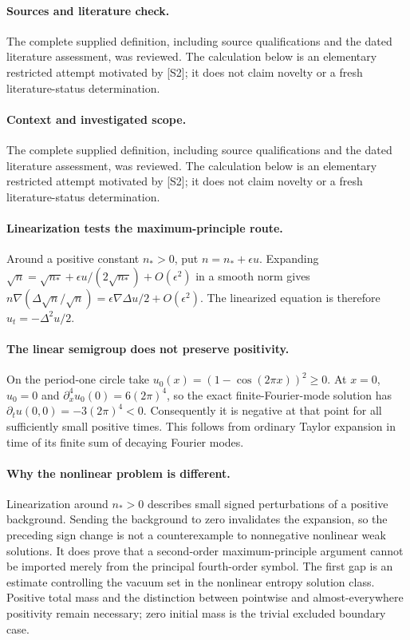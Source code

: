 \documentclass[11pt]{article}
\begin{document}
\paragraph{Sources and literature check.}
The complete supplied definition, including source qualifications and the dated literature assessment, was reviewed. The calculation below is an elementary restricted attempt motivated by [S2]; it does not claim novelty or a fresh literature-status determination.

\paragraph{Context and investigated scope.} The complete supplied definition, including source qualifications and the dated literature assessment, was reviewed. The calculation below is an elementary restricted attempt motivated by [S2]; it does not claim novelty or a fresh literature-status determination.

\paragraph{Linearization tests the maximum-principle route.} Around a positive constant $n_*>0$, put $n=n_*+\epsilon u$. Expanding $\sqrt n=\sqrt{n_*}+\epsilon u/(2\sqrt{n_*})+O(\epsilon^2)$ in a smooth norm gives $n\nabla(\Delta\sqrt n/\sqrt n)=\epsilon\nabla\Delta u/2+O(\epsilon^2)$. The linearized equation is therefore $u_t=-\Delta^2u/2$.

\paragraph{The linear semigroup does not preserve positivity.} On the period-one circle take $u_0(x)=(1-\cos(2\pi x))^2\geq0$. At $x=0$, $u_0=0$ and $\partial_x^4u_0(0)=6(2\pi)^4$, so the exact finite-Fourier-mode solution has $\partial_tu(0,0)=-3(2\pi)^4<0$. Consequently it is negative at that point for all sufficiently small positive times. This follows from ordinary Taylor expansion in time of its finite sum of decaying Fourier modes.

\paragraph{Why the nonlinear problem is different.} Linearization around $n_*>0$ describes small signed perturbations of a positive background. Sending the background to zero invalidates the expansion, so the preceding sign change is not a counterexample to nonnegative nonlinear weak solutions. It does prove that a second-order maximum-principle argument cannot be imported merely from the principal fourth-order symbol. The first gap is an estimate controlling the vacuum set in the nonlinear entropy solution class. Positive total mass and the distinction between pointwise and almost-everywhere positivity remain necessary; zero initial mass is the trivial excluded boundary case.
\end{document}
